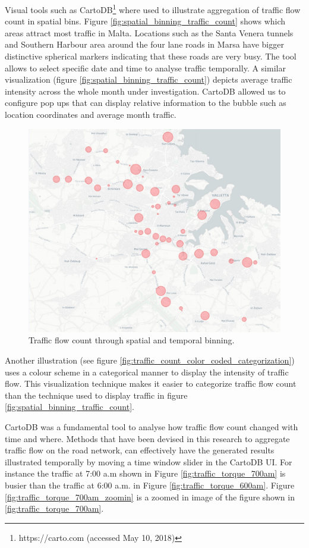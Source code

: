 \documentclass[12pt, a4paper]{report}
\theoremstyle{definition}
\theoremstyle{definition}%
\theoremstyle{definition}%
\theoremstyle{definition}%
\theoremstyle{definition}%
\theoremstyle{definition}%
\begin{document}
Visual tools such as CartoDB\footnote{https://carto.com (accessed May 10, 2018)} where used to illustrate aggregation of traffic flow count in spatial bins. Figure \ref{fig:spatial_binning_traffic_count} shows which areas attract most traffic in Malta. Locations such as the Santa Venera tunnels and Southern Harbour area around the four lane roads in Marsa have bigger distinctive spherical markers indicating that these roads are very busy. The tool allows to select specific date and time to analyse traffic temporally. A similar visualization (figure \ref{fig:spatial_binning_traffic_count}) depicts average traffic intensity across the whole month under investigation. CartoDB allowed us to configure pop ups that can display relative information to the bubble such as location coordinates and average month traffic.

\begin{figure}[!]	
	\includegraphics[scale=0.5]{traffic_month_average.jpg}
	\centering
	\caption{Traffic flow count through spatial and temporal binning. }
	\label{fig:traffic_month_average}
\end{figure}

Another illustration (see figure \ref{fig:traffic_count_color_coded_categorization}) uses a colour scheme in a categorical manner to display the intensity of traffic flow. This visualization technique makes it easier to categorize traffic flow count than the technique used to display traffic in figure \ref{fig:spatial_binning_traffic_count}.

CartoDB was a fundamental tool to analyse how traffic flow count changed with time and where. Methods that have been devised in this research to aggregate traffic flow on the road network, can effectively have the generated results illustrated temporally by moving a time window slider in the CartoDB UI. For instance the traffic at 7:00 a.m shown in Figure \ref{fig:traffic_torque_700am} is busier than the traffic at 6:00 a.m. in Figure  \ref{fig:traffic_torque_600am}. Figure \ref{fig:traffic_torque_700am_zoomin} is a zoomed in image of the figure shown in  \ref{fig:traffic_torque_700am}.
\end{document}
